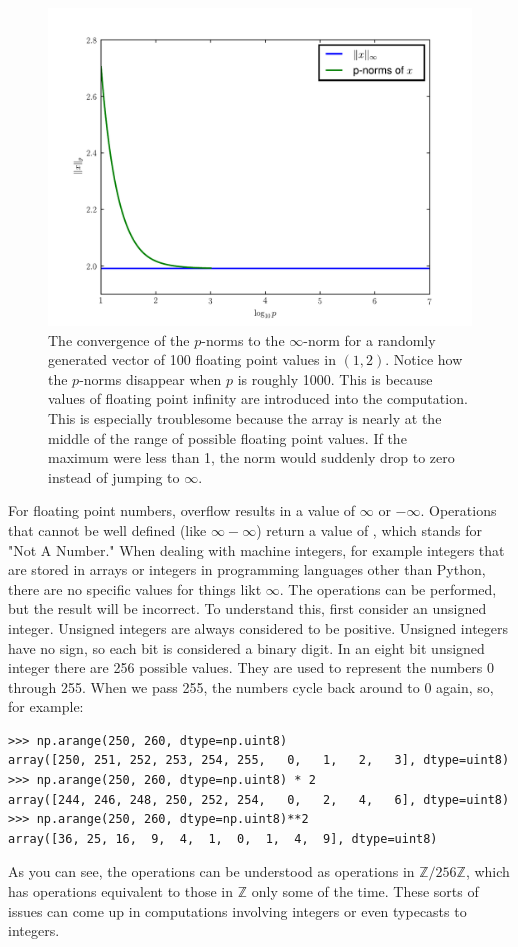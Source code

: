 \begin{figure}
\includegraphics[width=\textwidth]{pnorm_convergence.pdf}
\caption{The convergence of the $p$-norms to the $\infty$-norm for a randomly generated vector of 100 floating point values in $(1,2)$.
Notice how the $p$-norms disappear when $p$ is roughly 1000.
This is because values of floating point infinity are introduced into the computation.
This is especially troublesome because the array is nearly at the middle of the range of possible floating point values.
If the maximum were less than 1, the norm would suddenly drop to zero instead of jumping to $\infty$.}
\label{pnorm_convergence}
\end{figure}

For floating point numbers, overflow results in a value of $\infty$ or $-\infty$.
Operations that cannot be well defined (like $\infty - \infty$) return a value of , which stands for "Not A Number."
When dealing with machine integers, for example integers that are stored in arrays or integers in programming languages other than Python, there are no specific values for things likt $\infty$.
The operations can be performed, but the result will be incorrect.
To understand this, first consider an unsigned integer.
Unsigned integers are always considered to be positive.
Unsigned integers have no sign, so each bit is considered a binary digit.
In an eight bit unsigned integer there are 256 possible values.
They are used to represent the numbers 0 through 255.
When we pass 255, the numbers cycle back around to 0 again, so, for example:
\begin{lstlisting}
>>> np.arange(250, 260, dtype=np.uint8)
array([250, 251, 252, 253, 254, 255,   0,   1,   2,   3], dtype=uint8)
>>> np.arange(250, 260, dtype=np.uint8) * 2
array([244, 246, 248, 250, 252, 254,   0,   2,   4,   6], dtype=uint8)
>>> np.arange(250, 260, dtype=np.uint8)**2
array([36, 25, 16,  9,  4,  1,  0,  1,  4,  9], dtype=uint8)
\end{lstlisting}
As you can see, the operations can be understood as operations in $\mathbb{Z} / 256 \mathbb{Z}$, which has operations equivalent to those in $\mathbb{Z}$ only some of the time.
These sorts of issues can come up in computations involving integers or even typecasts to integers.

